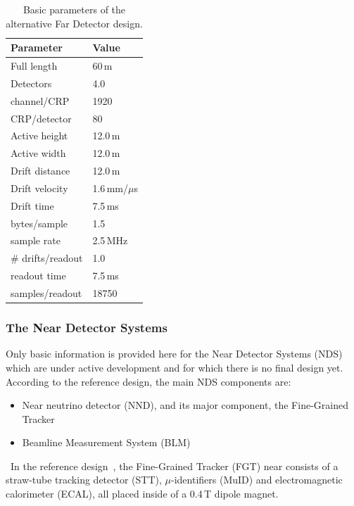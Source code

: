 \label{sec:alt-fundamental-parameters}
\begin{table}[ht!]
	\centering
	\begin{tabular}{| p{2.5in} | p{1in} |}
		\hline
		\textbf{Parameter} & \textbf{Value} \\ \hline

Full length & 60\,m \\ \hline
Detectors & 4.0 \\ \hline
channel/CRP & 1920 \\ \hline
CRP/detector & 80 \\ \hline
Active height & 12.0\,m \\ \hline
Active width  & 12.0\,m \\ \hline
Drift distance & 12.0\,m \\ \hline
Drift velocity & 1.6\,mm/$\mu$s \\ \hline
Drift time & 7.5\,ms \\ \hline
bytes/sample & 1.5 \\ \hline
sample rate & 2.5\,MHz \\ \hline
\# drifts/readout & 1.0 \\ \hline
readout time & 7.5\,ms \\ \hline
samples/readout & 18750 \\ \hline
	\end{tabular}
	\caption{Basic parameters of the alternative Far Detector design.}
	\label{tab:alt-fundamental-parameters}
\end{table}

\subsubsection{The Near Detector Systems}
\label{sec:nds-params}
Only basic information is provided here for the Near Detector Systems (NDS) which are under active development
and for which there is no final design yet. According to the reference design, the main NDS components are:
\begin{itemize}
\item Near neutrino detector (NND), and its major component, the Fine-Grained Tracker
\item Beamline Measurement System (BLM)
\end{itemize}
\ 
In the reference design~\cite{cdr_vol4_docdb}, the Fine-Grained Tracker (FGT) near consists of a straw-tube
tracking detector (STT), $\mu$-identifiers (MuID) and electromagnetic calorimeter (ECAL), all placed inside of a 0.4\,T dipole magnet.

